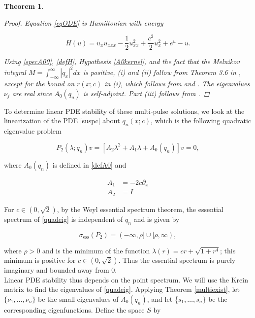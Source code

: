 \documentclass[12pt]{article}
\newtheorem{theorem}{Theorem}
\begin{document}
\begin{theorem}
\begin{proof}
Equation \eqref{eqODE} is Hamiltonian with energy

\begin{equation}\label{defH}
H(u) = u_x u_{xxx} - \frac{1}{2}u_{xx}^2 + \frac{c^2}{2}u_x^2 + e^u - u.
\end{equation}

Using \eqref{specA00}, \eqref{defH}, Hypothesis \ref{A0kernel}, and the fact that the Melnikov integral $M = \int_{-\infty}^\infty |q_x|^2 dx$ is positive, (i) and (ii) follow from Theorem 3.6 in \cite{Sandstede1997}, except for the bound on $r(x; c)$ in (i), which follows from \cite{Sanstede1993} and \cite{Sandstede1998}. The eigenvalues $\nu_j$ are real since $A_0(q_n)$ is self-adjoint. Part (iii) follows from \cite{Sandstede1998}.
\end{proof}
\end{theorem}

To determine linear PDE stability of these multi-pulse solutions, we look at the linearization of the PDE \eqref{suspc} about $q_n(x; c)$, which is the following quadratic eigenvalue problem

\begin{equation}\label{quadeig}
P_2(\lambda; q_n)v =  [A_2 \lambda^2 + A_1 \lambda + A_0(q_n)]v = 0,
\end{equation}

where $A_0(q_n)$ is defined in \eqref{defA0} and 

\begin{align}
A_1 &= -2 c \partial_x \\
A_2 &= I
\end{align}

For $c \in (0, \sqrt{2})$, by the Weyl essential spectrum theorem, the essential spectrum of \eqref{quadeig} is independent of $q_n$ and is given by

\begin{equation}\label{quadess}
\sigma_{\text{ess}}(P_2) = (-\infty, \rho] \cup [\rho, \infty),
\end{equation}

where $\rho > 0$ and is the minimum of the function $\lambda(r) = c r + \sqrt{1 + r^4}$; this minimum is positive for $c \in (0, \sqrt{2})$. Thus the essential spectrum is purely imaginary and bounded away from 0.\\

Linear PDE stability thus depends on the point spectrum. We will use the Krein matrix to find the eigenvalues of \eqref{quadeig}. Applying Theorem \ref{multiexist}, let $\{\nu_1, \dots, \nu_n\}$ be the small eigenvalues of $A_0(q_n)$, and let \{$s_1, \dots, s_n\}$ be the corresponding eigenfunctions. Define the space $S$ by
\end{document}

